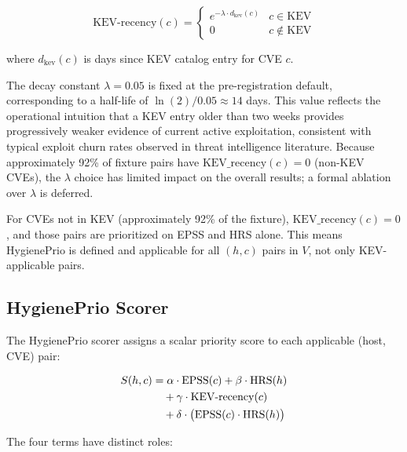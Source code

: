 \begin{equation}
 \mathrm{KEV\text{-}recency}(c) =
 \begin{cases}
 e^{-\lambda \cdot d_{\mathrm{kev}}(c)} & c \in \mathrm{KEV} \\
 0 & c \notin \mathrm{KEV}
 \end{cases}
 \label{eq:kev_recency}
\end{equation}

\noindent where $d_{\mathrm{kev}}(c)$ is days since KEV catalog entry for CVE $c$.

The decay constant $\lambda = 0.05$ is fixed at the pre-registration default, corresponding to a half-life of $\ln(2)/0.05 \approx 14$ days. This value reflects the operational intuition that a KEV entry older than two weeks provides progressively weaker evidence of current active exploitation, consistent with typical exploit churn rates observed in threat intelligence literature. Because approximately 92\% of fixture pairs have $\mathrm{KEV\_recency}(c) = 0$ (non-KEV CVEs), the $\lambda$ choice has limited impact on the overall results; a formal ablation over $\lambda$ is deferred.

For CVEs not in KEV (approximately 92\% of the fixture), $\mathrm{KEV\_recency}(c) = 0$, and those pairs are prioritized on EPSS and HRS alone. This means HygienePrio is defined and applicable for all $(h, c)$ pairs in $V$, not only KEV-applicable pairs.

\subsection{HygienePrio Scorer}

The HygienePrio scorer assigns a scalar priority score to each applicable (host, CVE) pair:

\begin{align}
 S(h, c) &= \alpha \cdot \mathrm{EPSS}(c)
 + \beta \cdot \mathrm{HRS}(h) \notag\\
 &\quad + \gamma \cdot \mathrm{KEV\text{-}recency}(c) \notag\\
 &\quad + \delta \cdot \bigl(\mathrm{EPSS}(c) \cdot \mathrm{HRS}(h)\bigr)
 \label{eq:scorer}
\end{align}

The four terms have distinct roles:

